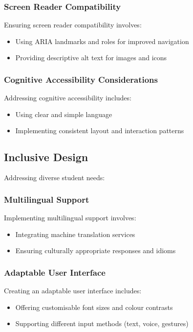 \documentclass[15pt,a4paper]{article}
\begin{document}
\begin{multicols}{2}
\subsubsection*{Screen Reader Compatibility}
Ensuring screen reader compatibility \textit{\parencite{WebAIM2024}} involves:
\begin{itemize}
    \item Using ARIA landmarks and roles for improved navigation
    \item Providing descriptive alt text for images and icons
\end{itemize}

\subsubsection*{Cognitive Accessibility Considerations}
Addressing cognitive accessibility \textit{\parencite[pp. 1-10]{Yesilada2023}} includes:
\begin{itemize}
    \item Using clear and simple language
    \item Implementing consistent layout and interaction patterns
\end{itemize}

\subsection{Inclusive Design}
Addressing diverse student needs:

\subsubsection*{Multilingual Support}
Implementing multilingual support \textit{\parencite[pp. 50-100]{AnastasiouSchaler2023}} involves:
\begin{itemize}
    \item Integrating machine translation services
    \item Ensuring culturally appropriate responses and idioms
\end{itemize}

\subsubsection*{Adaptable User Interface}
Creating an adaptable user interface \textit{\parencite[pp. 20-50]{HarperYesilada2024}} includes:
\begin{itemize}
    \item Offering customisable font sizes and colour contrasts
    \item Supporting different input methods (text, voice, gestures)
\end{itemize}


\end{multicols}
\end{document}
